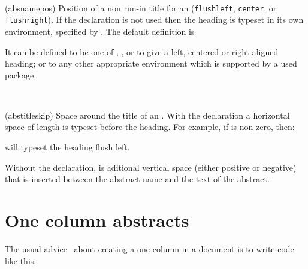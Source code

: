 \begin{syntax}
\cmd{\absnamepos} \\
\end{syntax}
\glossary(absnamepos)%
  {}%
  {Position of a non run-in title for an  (\texttt{flushleft}, 
   \texttt{center}, or \texttt{flushright}).}
   If the \cmd{\abstractrunin} declaration is not used then the heading 
is typeset in its own environment, specified by 
\cmd{\absnamepos}. The default definition is
\begin{lcode}
\newcommand{\absnamepos}{center}
\end{lcode}
It can be defined to be one of , ,
or  to give a left, centered or right aligned heading; 
or to any
other appropriate environment which is supported by a used package.

\begin{syntax}
\lnc{\abstitleskip} \\
\end{syntax}
\glossary(abstitleskip)%
  {}
  {Space around the title of an .}
   With the \cmd{\abstractrunin} declaration a horizontal space of length 
\lnc{\abstitleskip} is typeset
before the heading. For example, if \lnc{\absparindent} is non-zero, then:
\begin{lcode}
\setlength{\abstitleskip}{-\absparindent}
\end{lcode}
 will typeset the heading flush left.

Without the \cmd{\abstractrunin} declaration, \lnc{\abstitleskip} is 
aditional vertical 
space (either positive
or negative) that is inserted between the abstract name and the text of
the abstract.


\section{One column abstracts}


   The usual advice~\cite{FAQ} about creating a 
one-column 
 in a 
 document is to write code like this:

